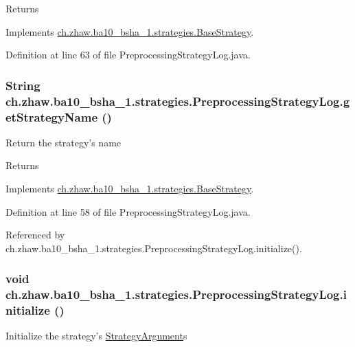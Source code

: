 \begin{DoxyReturn}{Returns}

\end{DoxyReturn}


Implements \hyperlink{classch_1_1zhaw_1_1ba10__bsha__1_1_1strategies_1_1BaseStrategy_a75fdb36932ad701f6375cc1fe718056b}{ch.zhaw.ba10\_\-bsha\_\-1.strategies.BaseStrategy}.

Definition at line 63 of file PreprocessingStrategyLog.java.\hypertarget{classch_1_1zhaw_1_1ba10__bsha__1_1_1strategies_1_1PreprocessingStrategyLog_a278aa48e1f1dd64d130fe528d879c632}{
\subsubsection[{getStrategyName}]{\setlength{\rightskip}{0pt plus 5cm}String ch.zhaw.ba10\_\-bsha\_\-1.strategies.PreprocessingStrategyLog.getStrategyName ()}}
\label{classch_1_1zhaw_1_1ba10__bsha__1_1_1strategies_1_1PreprocessingStrategyLog_a278aa48e1f1dd64d130fe528d879c632}
Return the strategy's name

\begin{DoxyReturn}{Returns}

\end{DoxyReturn}


Implements \hyperlink{classch_1_1zhaw_1_1ba10__bsha__1_1_1strategies_1_1BaseStrategy_aa0ebed55eed45409bad13d43a0058780}{ch.zhaw.ba10\_\-bsha\_\-1.strategies.BaseStrategy}.

Definition at line 58 of file PreprocessingStrategyLog.java.

Referenced by ch.zhaw.ba10\_\-bsha\_\-1.strategies.PreprocessingStrategyLog.initialize().\hypertarget{classch_1_1zhaw_1_1ba10__bsha__1_1_1strategies_1_1PreprocessingStrategyLog_acac70ca9f34f19eb4f6a762895b2ffec}{
\subsubsection[{initialize}]{\setlength{\rightskip}{0pt plus 5cm}void ch.zhaw.ba10\_\-bsha\_\-1.strategies.PreprocessingStrategyLog.initialize ()}}
\label{classch_1_1zhaw_1_1ba10__bsha__1_1_1strategies_1_1PreprocessingStrategyLog_acac70ca9f34f19eb4f6a762895b2ffec}
Initialize the strategy's \hyperlink{classch_1_1zhaw_1_1ba10__bsha__1_1_1StrategyArgument}{StrategyArgument}s 

